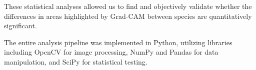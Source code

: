 \documentclass[a4paper,12pt]{report}
\begin{document}



These statistical analyses allowed us to find and objectively validate whether the differences in areas highlighted by Grad-CAM between species are quantitatively significant.

The entire analysis pipeline was implemented in Python, utilizing libraries including OpenCV for image processing, NumPy and Pandas for data manipulation, and SciPy for statistical testing. 





\end{document}
